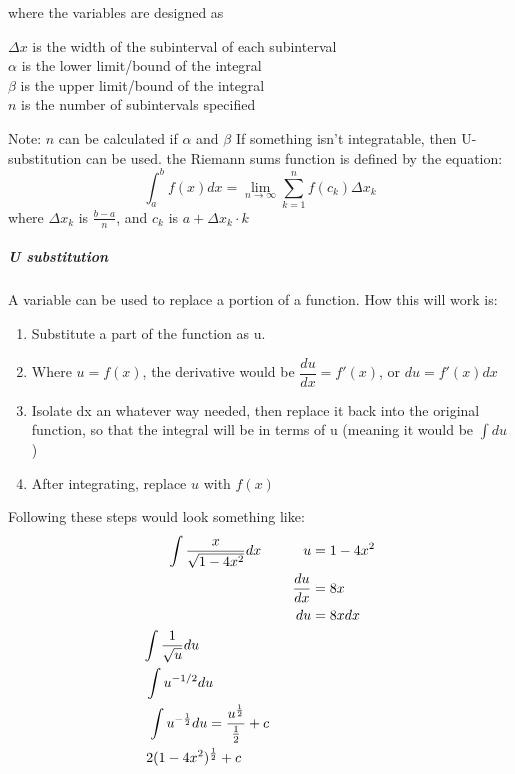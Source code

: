 \documentclass{article} %
\theoremstyle{theorem}
\theoremstyle{definition}
\begin{document}
                    where the variables are designed as
                    \begin{center}
                        $\Delta x$ is the width of the subinterval of each subinterval\\
                        $\alpha$ is the lower limit/bound of the integral\\
                        $\beta$ is the upper limit/bound of the integral\\
                        $n$ is the number of subintervals specified\\
                    \end{center}
                    Note: $n$ can be calculated if $\alpha$ and $\beta$
                    If something isn't integratable, then U-substitution can be used.
                    the Riemann sums function is defined by the equation:
                    \begin{equation}
                        \int^b_a f(x)dx = \lim_{n \to \infty} \sum_{k=1}^{n}f(c_k)\Delta x_k
                    \end{equation}
                    where $\Delta x_k$ is $\frac{b-a}{n}$, and $c_k$ is $a+\Delta x_k \cdot k$
                \subparagraph{U substitution}
                    A variable can be used to replace a portion of a function. How this will work is:
                    \begin{enumerate}
                        \item Substitute a part of the function as u.
                        \item Where $u = f(x)$, the derivative would be $\dfrac{du}{dx} = f'(x)$, or $du = f'(x)dx$
                        \item Isolate dx an whatever way needed, then replace it back into the original function, so that the integral will be in terms of u (meaning it would be $\int du$)
                        \item After integrating, replace $u$ with $f(x)$
                    \end{enumerate}
                    Following these steps would look something like:
                    \begin{align*}
                        \int \dfrac{x}{\sqrt{1-4x^2}}dx \hspace{30px}
                        u &= 1-4x^2\\
                        \dfrac{du}{dx} &= 8x\\
                        du&=8xdx \\
                        \int \dfrac{1}{\sqrt{u}}du \hspace{80px}\\
                        \int u^{-1/2}du \hspace{70px}\\
                        \int u^{-\frac{1}{2}}du = \dfrac{u^{\frac{1}{2}}}{\frac{1}{2}}+c\hspace{30px}\\
                        2(1-4x^2)^{\frac{1}{2}}+c\hspace*{50px}
                    \end{align*}
\end{document}
